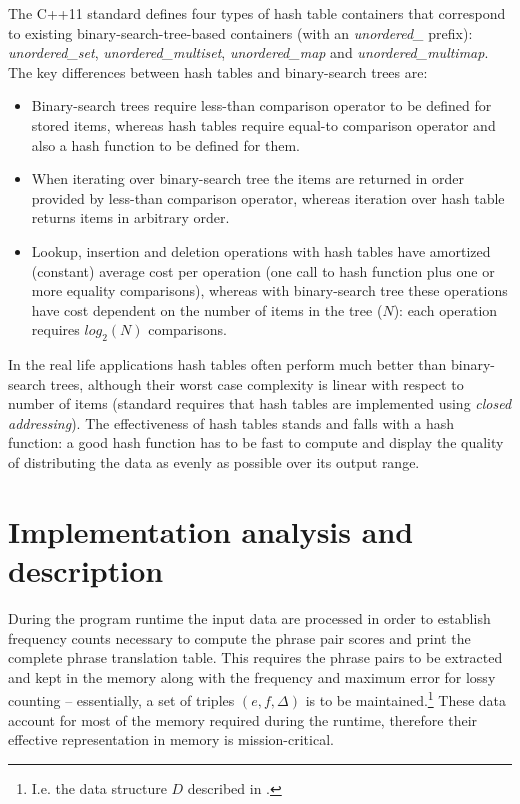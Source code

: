 The C++11 standard defines four types of hash table containers that correspond to existing
binary-search-tree-based containers (with an \emph{unordered_} prefix):
\emph{unordered_set}, \emph{unordered_multiset}, \emph{unordered_map} and \emph{unordered_multimap}.
The key differences between hash tables and binary-search trees are:
\begin{itemize}
  \item Binary-search trees require less-than comparison operator to be defined for stored items,
  whereas hash tables require equal-to comparison operator and also a hash function to be
  defined for them.
  \item When iterating over binary-search tree the items are returned in order provided by
  less-than comparison operator, whereas iteration over hash table returns items in arbitrary
  order.
  \item Lookup, insertion and deletion operations with hash tables have amortized (constant)
  average cost per operation (one call to hash function plus one or more equality comparisons),
  whereas with binary-search tree these operations have cost dependent on the number of items
  in the tree ($N$): each operation requires $log_2(N)$ comparisons.
\end{itemize}

In the real life applications hash tables often perform much better than binary-search
trees, although their worst case complexity is linear with respect to number of items
(standard requires that hash tables are implemented using
\emph{closed addressing}).
The effectiveness of hash tables stands and falls with a hash function:
a good hash function has to be fast to compute and display the quality of distributing
the data as evenly as possible over its output range.

\section{Implementation analysis and description}

During the program runtime the input data are processed in order to establish frequency counts
necessary to compute the phrase pair scores and print the complete phrase translation table.
This requires the phrase pairs to be extracted and kept in the memory along with the frequency
and maximum error for lossy counting -- essentially, a set of triples $(e, f, \Delta)$ is
to be maintained.\footnote{I.e. the data structure $D$ described in .}
These data account for most of the memory required during the runtime, therefore their effective
representation in memory is mission-critical.

